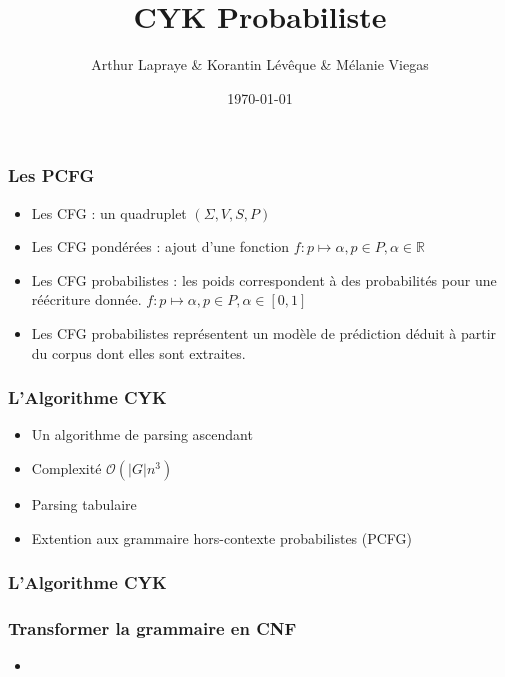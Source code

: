 \documentclass{beamer}
\begin{document}
\title{CYK Probabiliste}  %
\author{ Arthur Lapraye \& Korantin Lévêque \& Mélanie Viegas }

\date{\today}


\begin{frame}
 \maketitle
\end{frame}

\begin{frame}
 \frametitle{Les PCFG}
 \begin{itemize}
  \item<1-4>{Les CFG : un quadruplet $(\Sigma,V,S,P)$ }
  \item<2-4>{Les CFG pondérées : ajout d'une fonction $ f : p \mapsto \alpha, p \in P, \alpha \in \mathbb{R} $ }
  \item<3-4>{Les CFG probabilistes : les poids correspondent à des probabilités pour une réécriture donnée.  $ f : p \mapsto \alpha, p \in P, \alpha \in [0,1] $ }
  \item<4>{Les CFG probabilistes représentent un modèle de prédiction déduit à partir du corpus dont elles sont extraites.}
 \end{itemize}

\end{frame}

\begin{frame}
\frametitle{L'Algorithme CYK}
\begin{itemize}
  \item<1-4>{Un algorithme de parsing ascendant}
  \item<2-4>{Complexité $\mathcal{O}(|G|n^3) $ } %
  \item<3-4>{Parsing tabulaire}
  \item<4>{Extention aux grammaire hors-contexte probabilistes (PCFG)}
 \end{itemize}
 
\end{frame}

\begin{frame}
 \frametitle{L'Algorithme CYK}

\end{frame}

\begin{frame}
 \frametitle{Transformer la grammaire en CNF}
 \begin{itemize}
  \item<1-4>
 \end{itemize}

 
\end{frame}
\end{document}
